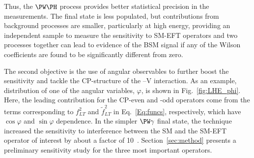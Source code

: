 \documentclass[a4paper,11pt]{article}
\renewcommand{\PV}{{{{V}}}\xspace}
\begin{document}
Thus, the $\PW\PH$ process provides better statistical precision in the measurements. 
The \PZ final state is less populated, 
but contributions from background processes are smaller, 
particularly at high energy, 
providing an independent sample to measure the sensitivity to SM-EFT operators and 
two processes together can lead to evidence of the BSM signal if any of the Wilson coefficients are found to be significantly different from zero.


The second objective is the use of
angular observables to further boost the sensitivity and tackle the CP-structure of the \PH--\PV interaction. 
As an example, 
distribution of one of the angular variables, $\varphi$, is shown in Fig.~\ref{fig:LHE_phi}. 
Here, the leading contribution for the CP-even and -odd operators come from the terms corresponding to $f^{2}_{LT}$ and $\tilde{f}^2_{LT}$ in Eq.~\eqref{Eq:funcs}, respectively, which have $\cos\varphi$ and $\sin\varphi$ dependence.
In the simpler $\PW\gamma$ final state, the technique increased the sensitivity to interference between the SM and the SM-EFT operator of interest by about a factor of 10~\cite{CMS-PAS-SMP-20-005}.
Section~\ref{sec:method} presents a preliminary sensitivity study for the three most important operators. 
\end{document}
